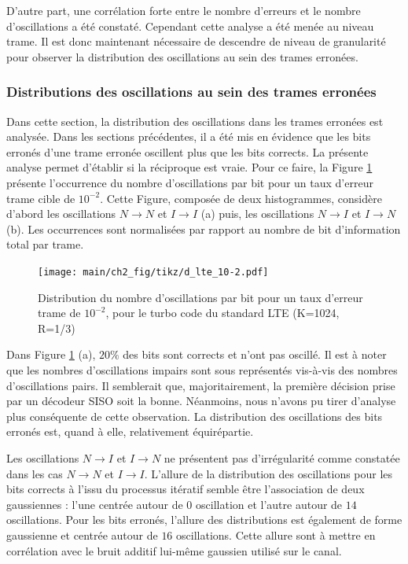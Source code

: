 D'autre part, une corrélation forte entre le nombre d'erreurs et le nombre d'oscillations a été constaté. Cependant 
cette analyse a été menée au niveau trame. Il est donc maintenant nécessaire de descendre de niveau de granularité pour observer 
la distribution des oscillations au sein des trames erronées.



\subsubsection{Distributions des oscillations au sein des trames erronées} 
Dans cette section, la distribution des oscillations dans les trames erronées est analysée. Dans les sections précédentes,
il a été mis en évidence que les bits erronés d'une trame erronée oscillent plus que les bits corrects. La présente analyse permet
d'établir si la réciproque est vraie. Pour ce faire, la Figure \ref{fig:d_lte_10-2} présente l’occurrence du nombre d'oscillations par bit pour un taux 
d'erreur trame cible de $10^{-2}$. Cette Figure, composée de deux histogrammes, considère d'abord les oscillations $N\rightarrow N$ et 
$I\rightarrow I$ (a) puis, les oscillations $N\rightarrow I$ et $I\rightarrow N$ (b). Les occurrences sont normalisées 
par rapport au nombre de bit d'information total par trame.


\begin{figure}[!t]
	\centering
	\texttt{[image: main/ch2\_fig/tikz/d\_lte\_10-2.pdf]}
	\caption{Distribution du nombre d'oscillations par bit pour un taux d'erreur trame de $10^{-2}$, pour le turbo code du standard LTE (K=1024, R=1/3) \label{fig:d_lte_10-2}}
\end{figure}

Dans Figure \ref{fig:d_lte_10-2} (a), $20\%$ des bits sont corrects et n'ont pas oscillé. Il est à noter que 
les nombres d'oscillations impairs sont sous représentés vis-à-vis des nombres d'oscillations pairs. Il semblerait que, 
majoritairement, la première décision prise par un décodeur SISO soit la bonne. Néanmoins, nous n'avons pu tirer d'analyse 
plus conséquente de 
cette observation. La distribution des oscillations des bits erronés est, quand à elle, relativement équirépartie. 

Les oscillations $N\rightarrow I$ et $I\rightarrow N$ ne présentent pas d’irrégularité comme constatée dans les cas 
$N\rightarrow N$ et $I\rightarrow I$. L'allure de la distribution des oscillations pour les bits corrects à l'issu du 
processus itératif semble être l'association de deux gaussiennes : l'une centrée autour de $0$ oscillation et l'autre 
autour de $14$ oscillations. Pour les 
bits erronés, l'allure des distributions est également de forme gaussienne et centrée autour de $16$ oscillations. Cette allure sont à
mettre en corrélation avec le bruit additif lui-même gaussien utilisé sur le canal.

